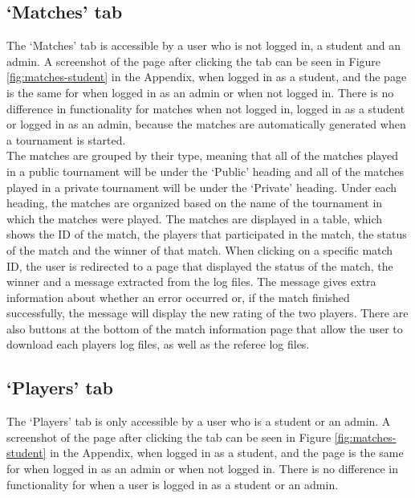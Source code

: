 \documentclass[a4paper, 12pt]{report}
\begin{document}
\subsection{`Matches' tab}
\label{sec:impl-tab-matches}

The `Matches' tab is accessible by a user who is not logged in, a student
and an admin. A screenshot of the page after clicking the tab can be seen in
Figure \ref{fig:matches-student} in the Appendix, when logged in as a student,
and the page is the same for when logged in as an admin or when not logged in.
There is no difference in functionality for matches when not logged in,
logged in as a student or logged in as an admin, because the matches are
automatically generated when a tournament is started. \\

The matches are grouped by their type, meaning that all of the matches played in
a public tournament will be under the `Public' heading and all of the matches
played in a private tournament will be under the `Private' heading. Under each
heading, the matches are organized based on the name of the tournament in which
the matches were played. The matches are displayed in a table, which shows the
ID of the match, the players that participated in the match, the status of the
match and the winner of that match. When clicking on a specific match ID, the user
is redirected to a page that displayed the status of the match, the winner and a
message extracted from the log files. The message gives extra information about
whether an error occurred or, if the match finished successfully, the message will
display the new rating of the two players. There are also buttons at the bottom
of the match information page that allow the user to download each players log
files, as well as the referee log files.

\subsection{`Players' tab}
\label{sec:impl-tab-players}

The `Players' tab is only accessible by a user who is a student or an admin. A
screenshot of the page after clicking the tab can be seen in Figure
\ref{fig:matches-student} in the Appendix, when logged in as a student, and the
page is the same for when logged in as an admin or when not logged in. There is
no difference in functionality for when a user is logged in as a student or an
admin. \\
\end{document}
